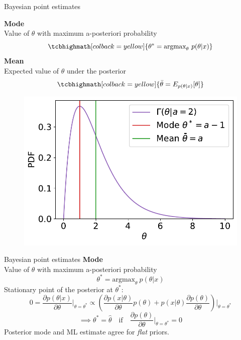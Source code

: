\documentclass[
aspectratio=169,
14pt,
professionalfonts
]{beamer}
\begin{document}
\begin{frame}{Bayesian point estimates}
    \begin{minipage}{0.49\textwidth}
        \textbf{Mode}\\ Value of $\theta$ with maximum a-posteriori probability
            $$
            \tcbhighmath[colback=yellow]{
            \theta^* = \text{argmax}_\theta ~ p(\theta|x)
            }
            $$
        \textbf{Mean}\\ Expected value of $\theta$ under the posterior
            $$
            \tcbhighmath[colback=yellow]{ 
            \bar{\theta} = E_{p(\theta|x)}[\theta]
            }
            $$
    \end{minipage}
    \begin{minipage}{0.49\textwidth}
        \begin{figure}
            \centering
            \includegraphics[width=\linewidth]{../plots/map_vs_mean.pdf}
        \end{figure}
    \end{minipage}
\end{frame}

\begin{frame}{Bayesian point estimates}
        \textbf{Mode}\\ Value of $\theta$ with maximum a-posteriori probability
            $$\theta^* = \text{argmax}_\theta ~ p(\theta|x)$$
        Stationary point of the posterior at $\theta^*$:
        $$0=\frac{\partial p(\theta|x)}{\partial \theta}\bigg\vert_{\theta = \theta^*} \propto 
        \left(
            \frac{\partial p(x|\theta)}{\partial \theta}p(\theta) + p(x|\theta) \frac{\partial p(\theta)}{\partial \theta}\right)\bigg\vert_{\theta = \theta^*}$$
        $$\implies \theta^* = \hat \theta \quad \text{if} \quad \frac{\partial p(\theta)}{\partial \theta}\bigg\vert_{\theta = \theta^*}=0$$
        Posterior mode and ML estimate agree for \textit{flat} priors.
\end{frame}
\end{document}
